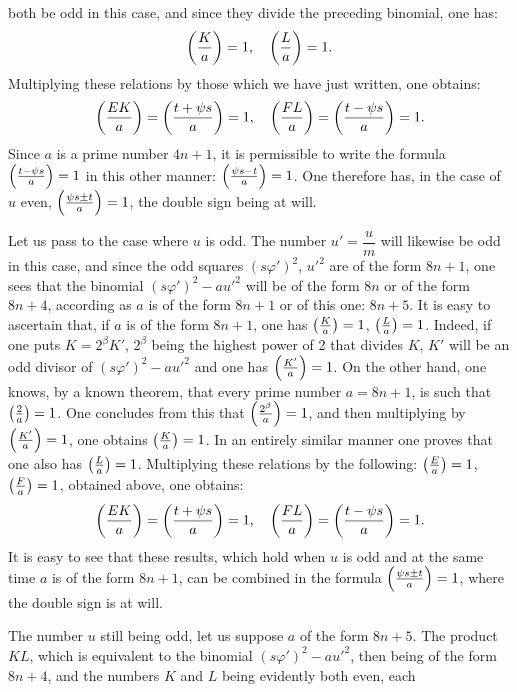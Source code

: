 \noindent
both be odd in this case, and since they divide the preceding binomial,
one has:
\[
\left(\frac{K}{a}\right)=1,\quad\left(\frac{L}{a}\right)=1.
\]
Multiplying these relations by those which we have just written, one obtains:
\[
\left(\frac{EK}{a}\right)=\left(\frac{t+\psi s}{a}\right)=1,\quad\left(\frac{FL}{a}\right)=\left(\frac{t-\psi s}{a}\right)=1.
\]
Since $a$ is a prime number $4n+1$, it is permissible to write the formula
$\left(\frac{t-\psi s}{a}\right)=1$ in this other manner: $\left(\frac{\psi s-t}{a}\right)=1$. One therefore has, in the case
of $u$ even, $\left(\frac{\psi s\pm t}{a}\right)=1$, the double sign being at will.
\par\indent
Let us pass to the case where $u$ is odd. The number $u'=\dfrac{u}{m}$ will likewise be
odd in this case, and since the odd squares $(s\varphi')^2$, $u'^2$ are of the form
$8n+1$, one sees that the binomial $(s\varphi')^2-au'^2$ will be of the form $8n$ or of the form
$8n+4$, according as $a$ is of the form $8n+1$ or of this one: $8n+5$. It is easy
to ascertain that, if $a$ is of the form $8n+1$, one has $\left(\frac{K}{a}\right)=1$, $\left(\frac{L}{a}\right)=1$.
Indeed, if one puts $K=2^\beta K'$, $2^\beta$ being the highest power of 2 that
divides $K$, $K'$ will be an odd divisor of $(s\varphi')^2-au'^2$ and one has $\left(\frac{K'}{a}\right)=1$.
On the other hand, one knows, by a known theorem, that every prime number
$a=8n+1$, is such that $\left(\frac{2}{a}\right)=1$. One concludes from this that $\left(\frac{2^\beta}{a}\right)=1$, and then
multiplying by $\left(\frac{K'}{a}\right)=1$, one obtains $\left(\frac{K}{a}\right)=1$. In an entirely
similar manner one proves that one also has $\left(\frac{L}{a}\right)=1$. Multiplying these relations by the following:
$\left(\frac{E}{a}\right)=1$, $\left(\frac{F}{a}\right)=1$, obtained above, one obtains:
\[
\left(\frac{EK}{a}\right)=\left(\frac{t+\psi s}{a}\right)=1,\quad\left(\frac{FL}{a}\right)=\left(\frac{t-\psi s}{a}\right)=1.
\]
It is easy to see that these results, which hold when $u$ is odd and
at the same time $a$ is of the form $8n+1$, can be combined in the formula
$\left(\frac{\psi s\pm t}{a}\right)=1$, where the double sign is at will.
\par\indent
The number $u$ still being odd, let us suppose $a$ of the form $8n+5$.
The product $KL$, which is equivalent to the binomial $(s\varphi')^2-au'^2$, then being of the form
$8n+4$, and the numbers $K$ and $L$ being evidently both even, each
